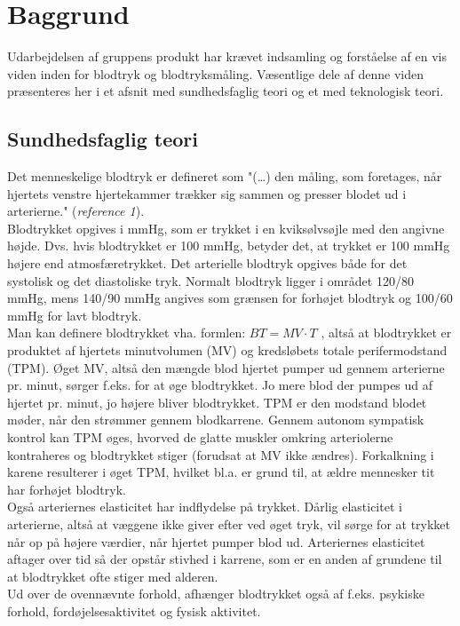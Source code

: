 \chapter{Baggrund}\label{kapitel_Baggrund}
Udarbejdelsen af gruppens produkt har krævet indsamling og forståelse af en vis viden inden for blodtryk og blodtryksmåling.
Væsentlige dele af denne viden præsenteres her i et afsnit med sundhedsfaglig teori og et med teknologisk teori.

\section{Sundhedsfaglig teori}

Det menneskelige blodtryk er defineret som "(…) den måling, som foretages, når hjertets venstre hjertekammer trækker sig sammen og presser blodet ud i arterierne." (\textit{reference 1}).\\
\newline
Blodtrykket opgives i mmHg, som er trykket i en kviksølvsøjle med den angivne højde. Dvs. hvis blodtrykket er 100 mmHg, betyder det, at trykket er 100 mmHg højere end atmosfæretrykket. 
Det arterielle blodtryk opgives både for det systolisk og det diastoliske tryk. Normalt blodtryk ligger i området 120/80 mmHg, mens 140/90 mmHg angives som grænsen for forhøjet blodtryk og 100/60 mmHg for lavt blodtryk. \\
\newline
Man kan definere blodtrykket vha. formlen: $BT = MV \cdot T$ , altså at blodtrykket er produktet af hjertets minutvolumen (MV) og kredsløbets totale perifermodstand (TPM).
Øget MV, altså den mængde blod hjertet pumper ud gennem arterierne pr. minut, sørger f.eks. for at øge blodtrykket. Jo mere blod der pumpes ud af hjertet pr. minut, jo højere bliver blodtrykket. 
TPM er den modstand blodet møder, når den strømmer gennem blodkarrene. Gennem autonom sympatisk kontrol kan TPM øges, hvorved de glatte muskler omkring arteriolerne kontraheres og blodtrykket stiger (forudsat at MV ikke ændres). Forkalkning i karene resulterer i øget TPM, hvilket bl.a. er grund til, at ældre mennesker tit har forhøjet blodtryk.\\
\newline
Også arteriernes elasticitet har indflydelse på trykket. Dårlig elasticitet i arterierne, altså at væggene ikke giver efter ved øget tryk, vil sørge for at trykket når op på højere værdier, når hjertet pumper blod ud. Arteriernes elasticitet aftager over tid så der opstår stivhed i karrene, som er en anden af grundene til at blodtrykket ofte stiger med alderen.\\
Ud over de ovennævnte forhold, afhænger blodtrykket også af f.eks. psykiske forhold, fordøjelsesaktivitet og fysisk aktivitet. \\

